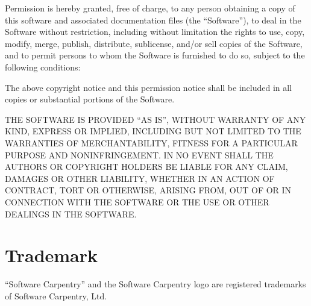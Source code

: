 \documentclass{book}
\begin{document}
Permission is hereby granted, free of charge, to any person obtaining a
copy of this software and associated documentation files (the
``Software''), to deal in the Software without restriction, including
without limitation the rights to use, copy, modify, merge, publish,
distribute, sublicense, and/or sell copies of the Software, and to
permit persons to whom the Software is furnished to do so, subject to
the following conditions:

The above copyright notice and this permission notice shall be included
in all copies or substantial portions of the Software.

THE SOFTWARE IS PROVIDED ``AS IS'', WITHOUT WARRANTY OF ANY KIND,
EXPRESS OR IMPLIED, INCLUDING BUT NOT LIMITED TO THE WARRANTIES OF
MERCHANTABILITY, FITNESS FOR A PARTICULAR PURPOSE AND NONINFRINGEMENT.
IN NO EVENT SHALL THE AUTHORS OR COPYRIGHT HOLDERS BE LIABLE FOR ANY
CLAIM, DAMAGES OR OTHER LIABILITY, WHETHER IN AN ACTION OF CONTRACT,
TORT OR OTHERWISE, ARISING FROM, OUT OF OR IN CONNECTION WITH THE
SOFTWARE OR THE USE OR OTHER DEALINGS IN THE SOFTWARE.

\section{Trademark}

``Software Carpentry'' and the Software Carpentry logo are registered
trademarks of Software Carpentry, Ltd.
\end{document}
